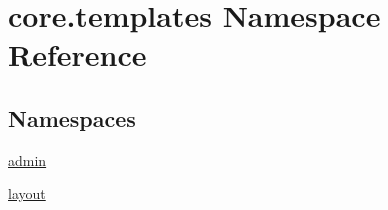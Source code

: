 \hypertarget{namespacecore_1_1templates}{\section{core.\-templates Namespace Reference}
\label{namespacecore_1_1templates}
}
\subsection*{Namespaces}
\begin{DoxyCompactItemize}
\item 
\hyperlink{namespacecore_1_1templates_1_1admin}{admin}
\item 
\hyperlink{namespacecore_1_1templates_1_1layout}{layout}
\end{DoxyCompactItemize}
